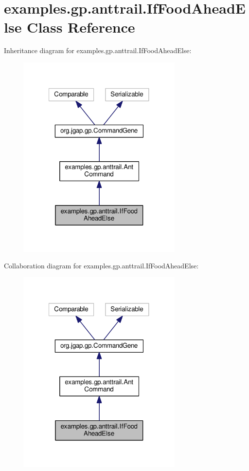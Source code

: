 \hypertarget{classexamples_1_1gp_1_1anttrail_1_1_if_food_ahead_else}{\section{examples.\-gp.\-anttrail.\-If\-Food\-Ahead\-Else Class Reference}
\label{classexamples_1_1gp_1_1anttrail_1_1_if_food_ahead_else}
}


Inheritance diagram for examples.\-gp.\-anttrail.\-If\-Food\-Ahead\-Else\-:
\nopagebreak
\begin{figure}[H]
\begin{center}
\leavevmode
\includegraphics[width=233pt]{classexamples_1_1gp_1_1anttrail_1_1_if_food_ahead_else__inherit__graph}
\end{center}
\end{figure}


Collaboration diagram for examples.\-gp.\-anttrail.\-If\-Food\-Ahead\-Else\-:
\nopagebreak
\begin{figure}[H]
\begin{center}
\leavevmode
\includegraphics[width=233pt]{classexamples_1_1gp_1_1anttrail_1_1_if_food_ahead_else__coll__graph}
\end{center}
\end{figure}
